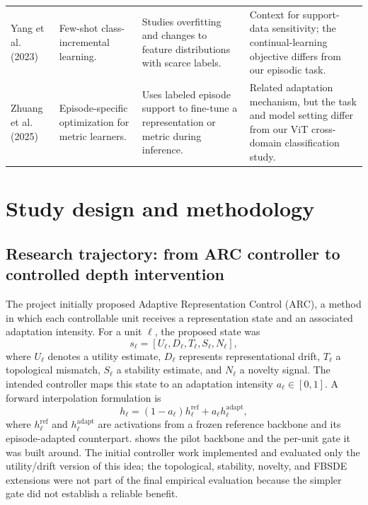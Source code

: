 \documentclass[11pt]{article}
\begin{document}
\begin{longtable}{P{0.13\textwidth}P{0.21\textwidth}P{0.28\textwidth}P{0.24\textwidth}}
Yang et al. (2023) \cite{yang2023} & Few-shot class-incremental learning. & Studies overfitting and changes to feature distributions with scarce labels. & Context for support-data sensitivity; the continual-learning objective differs from our episodic task.\\
Zhuang et al. (2025) \cite{zhuang2025} & Episode-specific optimization for metric learners. & Uses labeled episode support to fine-tune a representation or metric during inference. & Related adaptation mechanism, but the task and model setting differ from our ViT cross-domain classification study.\\
\bottomrule
\end{longtable}

\section{Study design and methodology}
\label{sec:method}

\subsection{Research trajectory: from ARC controller to controlled depth intervention}

The project initially proposed Adaptive Representation Control (ARC), a method in which each controllable unit receives a representation state and an associated adaptation intensity. For a unit $\ell$, the proposed state was
\begin{equation}
 s_\ell = [U_\ell,D_\ell,T_\ell,S_\ell,N_\ell],
\end{equation}
where $U_\ell$ denotes a utility estimate, $D_\ell$ represents representational drift, $T_\ell$ a topological mismatch, $S_\ell$ a stability estimate, and $N_\ell$ a novelty signal. The intended controller maps this state to an adaptation intensity $a_\ell\in[0,1]$. A forward interpolation formulation is
\begin{equation}
 h_\ell = (1-a_\ell)h_\ell^{\mathrm{ref}}+a_\ell h_\ell^{\mathrm{adapt}},
 \label{eq:arcblend}
\end{equation}
where $h_\ell^{\mathrm{ref}}$ and $h_\ell^{\mathrm{adapt}}$ are activations from a frozen reference backbone and its episode-adapted counterpart.  shows the pilot backbone and the per-unit gate it was built around. The initial controller work implemented and evaluated only the utility/drift version of this idea; the topological, stability, novelty, and FBSDE extensions were not part of the final empirical evaluation because the simpler gate did not establish a reliable benefit.
\end{document}
